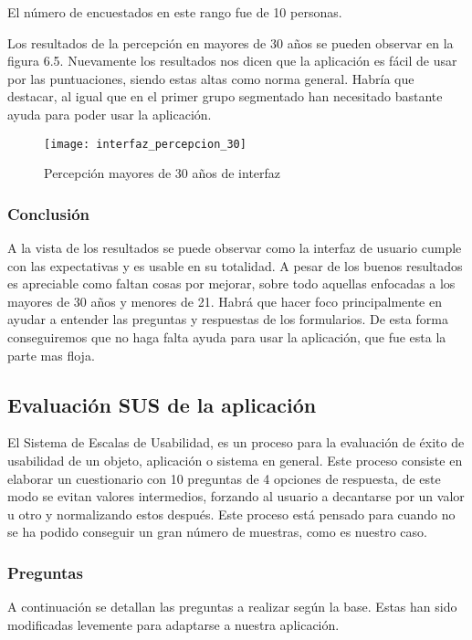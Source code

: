 El número de encuestados en este rango fue de 10 personas.

Los resultados de la percepción en mayores de 30 años se pueden observar en la figura 6.5.
Nuevamente los resultados nos dicen que la aplicación es fácil de usar por las puntuaciones,
siendo estas altas como norma general. Habría que destacar, al igual que en el primer grupo segmentado
han necesitado bastante ayuda para poder usar la aplicación.

\begin{figure}[htb]
  \centering
  \texttt{[image: interfaz\_percepcion\_30]}
  \caption[Percepción mayores de 30 años de interfaz]{Percepción mayores de 30 años de interfaz}
  \label{fig:Percepción mayores de 30 años de interfaz}
\end{figure}

\subsubsection{Conclusión}
A la vista de los resultados se puede observar como la interfaz de usuario cumple
con las expectativas y es usable en su totalidad. A pesar de los buenos resultados
es apreciable como faltan cosas por mejorar, sobre todo aquellas enfocadas a los
mayores de 30 años y menores de 21. Habrá que hacer foco principalmente en
ayudar a entender las preguntas y respuestas de los formularios. De esta forma
conseguiremos que no haga falta ayuda para usar la aplicación, que fue esta
la parte mas floja.

\subsection{Evaluación SUS de la aplicación}
El Sistema de Escalas de Usabilidad, es un proceso para la evaluación de éxito
de usabilidad de un objeto, aplicación o sistema en general. Este proceso consiste
en elaborar un cuestionario con 10 preguntas de 4 opciones de respuesta, de este modo
se evitan valores intermedios, forzando al usuario a decantarse por un valor u otro y
normalizando estos después. Este proceso está pensado para cuando no se ha podido
conseguir un gran número de muestras, como es nuestro caso.

\subsubsection{Preguntas}
A continuación se detallan las preguntas a realizar según la base. Estas han sido modificadas
levemente para adaptarse a nuestra aplicación.

